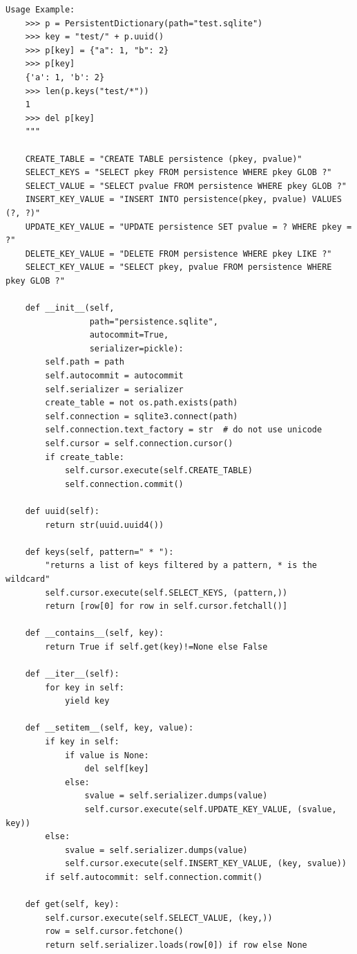 \documentclass[justified, sixbynine]{tufte-book}
\def\ft{\small\tt}
\theoremstyle{plain}%
\newtheorem * {corollary}{Corollary}
\theoremstyle{definition}
\theoremstyle{remark}
\newtheorem * {remark}{Remark}
\newtheorem * {note}{Note}
\begin{document}
\begin{fullwidth}
\begin{lstlisting}[caption={in file: {\ft nlib.py}}]
    Usage Example:
    >>> p = PersistentDictionary(path="test.sqlite")
    >>> key = "test/" + p.uuid()
    >>> p[key] = {"a": 1, "b": 2}
    >>> p[key]
    {'a': 1, 'b': 2}
    >>> len(p.keys("test/*"))
    1
    >>> del p[key]
    """

    CREATE_TABLE = "CREATE TABLE persistence (pkey, pvalue)"
    SELECT_KEYS = "SELECT pkey FROM persistence WHERE pkey GLOB ?"
    SELECT_VALUE = "SELECT pvalue FROM persistence WHERE pkey GLOB ?"
    INSERT_KEY_VALUE = "INSERT INTO persistence(pkey, pvalue) VALUES (?, ?)"
    UPDATE_KEY_VALUE = "UPDATE persistence SET pvalue = ? WHERE pkey = ?"
    DELETE_KEY_VALUE = "DELETE FROM persistence WHERE pkey LIKE ?"
    SELECT_KEY_VALUE = "SELECT pkey, pvalue FROM persistence WHERE pkey GLOB ?"

    def __init__(self, 
                 path="persistence.sqlite", 
                 autocommit=True, 
                 serializer=pickle):
        self.path = path
        self.autocommit = autocommit
        self.serializer = serializer
        create_table = not os.path.exists(path)
        self.connection = sqlite3.connect(path)
        self.connection.text_factory = str  # do not use unicode
        self.cursor = self.connection.cursor()
        if create_table:
            self.cursor.execute(self.CREATE_TABLE)
            self.connection.commit()

    def uuid(self):
        return str(uuid.uuid4())

    def keys(self, pattern=" * "):
        "returns a list of keys filtered by a pattern, * is the wildcard"
        self.cursor.execute(self.SELECT_KEYS, (pattern,))
        return [row[0] for row in self.cursor.fetchall()]

    def __contains__(self, key):
        return True if self.get(key)!=None else False

    def __iter__(self):
        for key in self:
            yield key

    def __setitem__(self, key, value):
        if key in self:
            if value is None:
                del self[key]
            else:
                svalue = self.serializer.dumps(value)
                self.cursor.execute(self.UPDATE_KEY_VALUE, (svalue, key))
        else:
            svalue = self.serializer.dumps(value)
            self.cursor.execute(self.INSERT_KEY_VALUE, (key, svalue))
        if self.autocommit: self.connection.commit()

    def get(self, key):
        self.cursor.execute(self.SELECT_VALUE, (key,))
        row = self.cursor.fetchone()
        return self.serializer.loads(row[0]) if row else None


\end{lstlisting}
\end{fullwidth}
\end{document}
